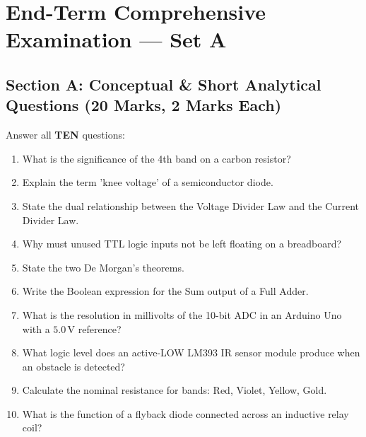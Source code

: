 \section{End-Term Comprehensive Examination --- Set A}


\subsection*{Section A: Conceptual \& Short Analytical Questions (20 Marks, 2 Marks Each)}
\noindent Answer all \textbf{TEN} questions:
\begin{enumerate}[leftmargin=1.8em, itemsep=3pt]
    \item What is the significance of the 4th band on a carbon resistor?
    \item Explain the term 'knee voltage' of a semiconductor diode.
    \item State the dual relationship between the Voltage Divider Law and the Current Divider Law.
    \item Why must unused TTL logic inputs not be left floating on a breadboard?
    \item State the two De Morgan's theorems.
    \item Write the Boolean expression for the Sum output of a Full Adder.
    \item What is the resolution in millivolts of the 10-bit ADC in an Arduino Uno with a $5.0\,\mathrm{V}$ reference?
    \item What logic level does an active-LOW LM393 IR sensor module produce when an obstacle is detected?
    \item Calculate the nominal resistance for bands: Red, Violet, Yellow, Gold.
    \item What is the function of a flyback diode connected across an inductive relay coil?
\end{enumerate}

